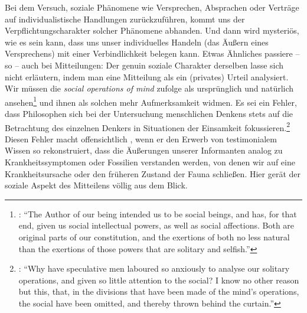 Bei dem Versuch, soziale Phänomene wie Versprechen, Absprachen oder Verträge auf
individualistische Handlungen zurückzuführen, kommt uns der
Verpflichtungscharakter solcher Phänomene abhanden. Und dann wird mysteriös, wie
es sein kann, dass uns unser individuelles Handeln (das Äußern eines
Versprechens) mit einer Verbindlichkeit belegen kann. Etwas Ähnliches passiere
-- so  -- auch bei
Mitteilungen: Der genuin soziale Charakter derselben lasse sich nicht erläutern,
indem man eine Mitteilung als ein (privates) Urteil 
analysiert. Wir müssen die \emph{social operations of mind} 
zufolge als ursprünglich und natürlich
ansehen\footnote{\cite[Vgl.][69]{Reid:EssaysontheIntellectualPowersofMan2002}:
\enquote{The Author of our being intended us to be social beings, and has, for
that end, given us social intellectual powers, as well as social affections.
Both are original parts of our constitution, and the exertions of both no less
natural than the exertions of those powers that are solitary and selfish.}} und
ihnen als solchen mehr Aufmerksamkeit widmen. Es sei ein Fehler, dass
Philosophen sich bei der Untersuchung menschlichen Denkens stets auf die
Betrachtung des einzelnen Denkers in Situationen der Einsamkeit
fokussieren.\footnote{\cite[Vgl.][70]{Reid:EssaysontheIntellectualPowersofMan2002}:
\enquote{Why have speculative men laboured so anxiously to analyse our solitary
operations, and given so little attention to the social? I know no other reason
but this, that, in the divisions that have been made of the mind’s operations,
the social have been omitted, and thereby thrown behind the curtain.}} Diesen
Fehler macht offensichtlich
, wenn er den Erwerb
von testimonialem Wissen so rekonstruiert, dass die Äußerungen unserer
Informanten analog zu Krankheitssymptomen oder Fossilien verstanden werden, von
denen wir auf eine Krankheitsursache oder den früheren Zustand der Fauna
schließen. Hier gerät der soziale Aspekt des Mitteilens völlig aus dem Blick.


